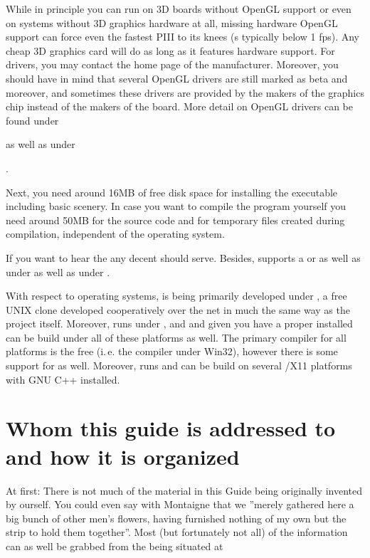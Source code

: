 While in principle you can run \FlightGear on 3D boards without OpenGL support or even on
systems without 3D graphics hardware at all, missing hardware OpenGL support can force
even the fastest PIII to its knees (s typically below 1 fps). Any cheap
3D graphics card will do as long as it features hardware  support. For
 drivers, you may contact the home page of the manufacturer.
Moreover, you should have in mind that several OpenGL drivers are
still marked as beta and moreover, and sometimes these drivers are provided by the makers
of the graphics chip instead of the makers of the board. More detail on OpenGL drivers
can be found under


\noindent
  as well as under

.

Next, you need around 16MB of free disk space for installing the executable including
basic scenery. In case you want to compile the program yourself you need around 50MB for
the source code and for temporary files created during compilation, independent of the
operating system.

If you want to hear the  any decent  should serve.
Besides, \FlightGear supports a  or  as well as  under  as well as under .

With respect to operating systems, \FlightGear is being primarily developed under
, a free UNIX clone developed cooperatively over the net in much the same
way as the \FlightGear project itself. Moreover, \FlightGear runs under ,  and  and given you have a proper
 installed can be build under all of these platforms as well. The primary
compiler for all platforms is the free  (i.\,e. the 
compiler under Win32), however there is some support for  as well. Moreover,
\FlightGear runs and can be build on several /X11 platforms with GNU C++
installed.

\section{Whom this guide is addressed to and how it is organized}

At first: There is not much of the material in this Guide being originally invented by
ourself. You could even say with Montaigne that we ''merely gathered here a big bunch of
other men's flowers, having furnished nothing of my own but the strip to hold them
together''. Most (but fortunately not all) of the information can as well be grabbed from
the  being situated at

